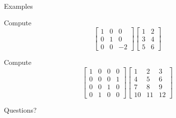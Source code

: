 \documentclass{beamer}
\begin{document}
\begin{frame}{Examples}
  \begin{example}
    Compute
    \begin{equation*}
      \left[
	\begin{array}{ccc}
          1&0&0\\
          0&1&0\\
          0&0&-2
	\end{array}
      \right]
      \left[
	\begin{array}{cc}
          1&2\\
          3&4\\
          5&6
	\end{array}
      \right]
    \end{equation*}
  \end{example}
  \begin{example}
    Compute
    \begin{equation*}
      \left[
	\begin{array}{cccc}
          1&0&0&0\\
          0&0&0&1\\
          0&0&1&0\\
          0&1&0&0
	\end{array}
      \right]
      \left[
	\begin{array}{ccc}
          1&2&3\\
          4&5&6\\
          7&8&9\\
          10&11&12
	\end{array}
      \right]
    \end{equation*}
  \end{example}
\end{frame}

\begin{frame}
  Questions?
\end{frame}
\end{document}
